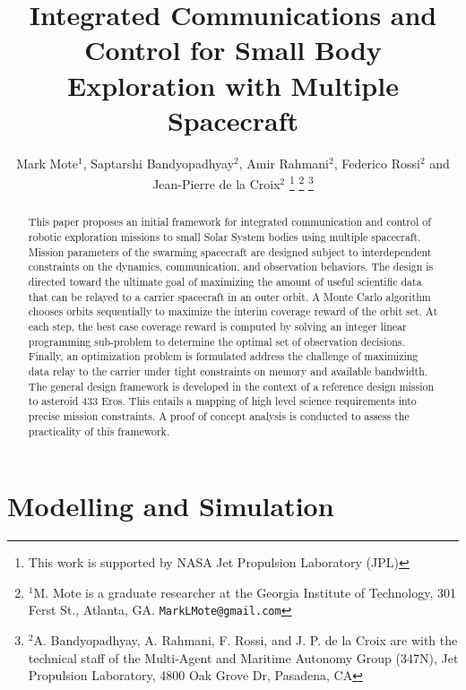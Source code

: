 \documentclass[letterpaper, 10 pt, conference]{ieeeconf}  %
\title{\LARGE \bf
Integrated Communications and Control for Small Body Exploration with Multiple Spacecraft
}
\author{Mark Mote$^{1}$, Saptarshi Bandyopadhyay$^{2}$, Amir Rahmani$^{2}$, Federico Rossi$^{2}$  and Jean-Pierre de la Croix$^{2}$%
\thanks{This work is supported by NASA Jet Propulsion Laboratory (JPL)}%
\thanks{$^{1}$M. Mote is a graduate researcher at the Georgia Institute of Technology,
        301 Ferst St., Atlanta, GA.
        {\tt\small MarkLMote@gmail.com}}%
\thanks{$^{2}$A. Bandyopadhyay, A. Rahmani, F. Rossi, and J. P. de la Croix are with the technical staff of the Multi-Agent and Maritime Autonomy Group (347N), Jet Propulsion Laboratory,  4800 Oak Grove Dr, Pasadena, CA
        {\tt\small }}%
}
\theoremstyle{definition}
\begin{document}
\maketitle
\thispagestyle{empty}
\pagestyle{empty}



\begin{abstract}

This paper proposes an initial framework for integrated communication and control of robotic exploration missions to small Solar System bodies using multiple spacecraft. 
Mission parameters of the
 swarming spacecraft are designed subject to interdependent constraints on the dynamics, communication, and observation behaviors. 
The design is directed toward the ultimate goal of maximizing the amount of useful scientific data that can be relayed to a carrier spacecraft in an outer orbit. 
A Monte Carlo algorithm chooses orbits sequentially to maximize the interim coverage reward of the orbit set.
At each step, the best case coverage reward is computed by solving an integer linear programming sub-problem to determine the optimal set of observation decisions. 
Finally, an optimization problem is formulated address the challenge of maximizing data relay to the carrier under tight constraints on memory and available bandwidth. 
The general design framework is developed in the context of a reference design mission to asteroid 433 Eros. 
This entails a mapping of high level science requirements into precise mission constraints. 
A proof of concept analysis is conducted to assess the practicality of this framework. 

\end{abstract}



\section{Modelling and Simulation} 
\end{document}
